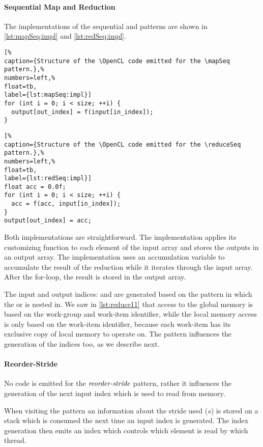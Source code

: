 \paragraph{Sequential Map and Reduction}
The \OpenCL implementations of the sequential \mapSeq and \reduceSeq patterns are shown in \autoref{lst:mapSeq:impl} and \autoref{lst:redSeq:impl}.
%
\begin{lstlisting}[%                                                             
caption={Structure of the \OpenCL code emitted for the \mapSeq pattern.},%
numbers=left,%
float=tb,
label={lst:mapSeq:impl}]
for (int i = 0; i < size; ++i) {
  output[out_index] = f(input[in_index]);
}
\end{lstlisting}
%
%
\begin{lstlisting}[%                                                             
caption={Structure of the \OpenCL code emitted for the \reduceSeq pattern.},%
numbers=left,%
float=tb,
label={lst:redSeq:impl}]
float acc = 0.0f;
for (int i = 0; i < size; ++i) {
  acc = f(acc, input[in_index]);
}
output[out_index] = acc;
\end{lstlisting}
%
Both implementations are straightforward.
The \mapSeq implementation applies its customizing function to each element of the input array and stores the outputs in an output array.
The \reduceSeq implementation uses an accumulation variable to accumulate the result of the reduction while it iterates through the input array.
After the for-loop, the result is stored in the output array.

The input and output indices:  and  are generated based on the pattern in which the \mapSeq or \reduceSeq is nested in.
We saw in \autoref{lst:reduce11} that access to the global memory is based on the work-group and work-item identifier, while the local memory access is only based on the work-item identifier, because each work-item has its exclusive copy of local memory to operate on.
The \reorderStride pattern influences the generation of the indices too, as we describe next.

\paragraph{Reorder-Stride}
No code is emitted for the $\text{\textit{reorder-stride}}$ pattern, rather it influences the generation of the next input index which is used to read from memory.

When visiting the \reorderStride pattern an information about the stride used ($s$) is stored on a stack which is consumed the next time an input index is generated.
The index generation then emits an index which controls which element is read by which thread.

